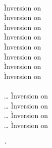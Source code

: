 \begin{description}
\item[] \ \\
  \newcommand{\pushtuplestack}{\frameexp{F}{\tupleexp{\cdot,\ldots}}}
  \begin{tabbing}
    \` Inversion on  \\
    \` Inversion on  \\
    \` Inversion on  \\
    \` Inversion on  \\
    \` Inversion on  \\
    \` Inversion on  \\
    \` Inversion on  \\
    \` Inversion on  \\
  \\
   \ldots
    \` Inversion on  \\
   \ldots
    \` Inversion on  \\
   \ldots
    \` Inversion on  \\
   \ldots
    \` Inversion on  \\
  \\
    \`  \\

\end{tabbing}
\end{description}
